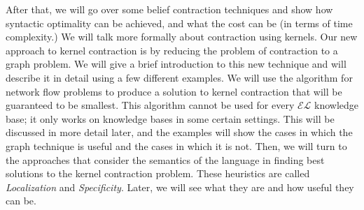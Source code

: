 After that, we will go over some belief contraction techniques and show how syntactic optimality can be achieved, and what the cost can be (in terms of time complexity.) We will talk more formally about contraction using kernels. Our new approach to kernel contraction is by reducing the problem of contraction to a graph problem. We will give a brief introduction to this new technique and will describe it in detail using a few different examples. We will use the algorithm for network flow problems to produce a solution to kernel contraction that will be guaranteed to be smallest. This algorithm cannot be used for every $\mathcal{EL}$ knowledge base; it only works on knowledge bases in some certain settings. This will be discussed in more detail later, and the examples will show the cases in which the graph technique is useful and the cases in which it is not. Then, we will turn to the approaches that consider the semantics of the language in finding best solutions to the kernel contraction problem. These heuristics are called \textit{Localization} and \textit{Specificity}. Later, we will see what they are and how useful they can be.
